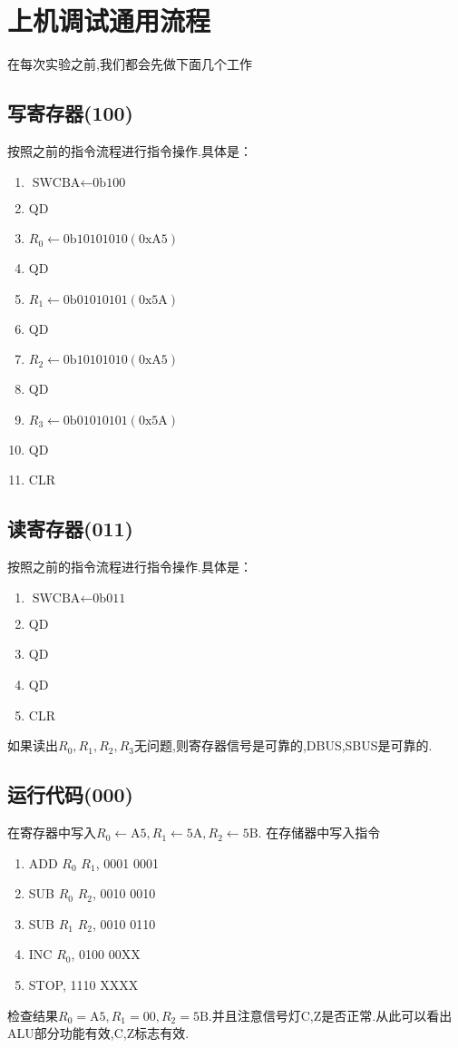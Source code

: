 \documentclass[UTF8]{ctexart}
\begin{document}
\section{上机调试通用流程}
在每次实验之前,我们都会先做下面几个工作
\subsection{写寄存器(100)}
按照之前的指令流程进行指令操作.具体是：
\begin{enumerate}
	\item $\text{SWCBA}\leftarrow \text{0b100}$
	\item QD
	\item $R_0\leftarrow \text{0b10101010}(\text{0xA5})$
	\item QD
	\item $R_1\leftarrow \text{0b01010101}(\text{0x5A})$
	\item QD
	\item $R_2\leftarrow \text{0b10101010}(\text{0xA5})$
	\item QD
	\item $R_3\leftarrow \text{0b01010101}(\text{0x5A})$
	\item QD
	\item CLR
\end{enumerate}
\subsection{读寄存器(011)}
按照之前的指令流程进行指令操作.具体是：
\begin{enumerate}
	\item $\text{SWCBA}\leftarrow \text{0b011}$
	\item QD
	\item QD
	\item QD
	\item CLR
\end{enumerate}
如果读出$R_0,R_1,R_2,R_3$无问题,则寄存器信号是可靠的,DBUS,SBUS是可靠的.
\subsection{运行代码(000)}
在寄存器中写入$R_0\leftarrow \text{A5}, R_1\leftarrow \text{5A}, R_2\leftarrow \text{5B}$.
在存储器中写入指令
\begin{enumerate}[\indent\indent]
	\item ADD $R_0$ $R_1$, 0001 0001
	\item SUB $R_0$ $R_2$, 0010 0010
	\item SUB $R_1$ $R_2$, 0010 0110
	\item INC $R_0$, 0100 00XX
	\item STOP, 1110 XXXX
\end{enumerate}
检查结果$R_0 = \text{A5}, R_1 = \text{00}, R_2 = \text{5B}$.并且注意信号灯C,Z是否正常.从此可以看出ALU部分功能有效,C,Z标志有效.
\end{document}
